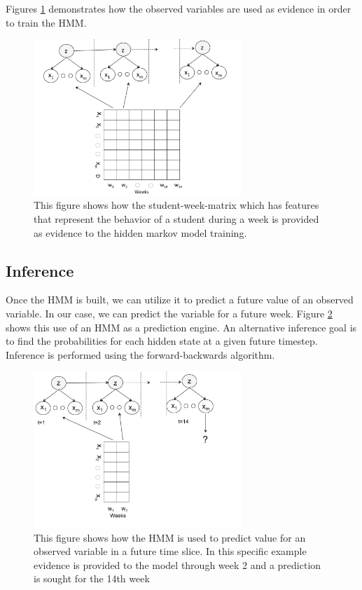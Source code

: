 Figures \ref{fig:hmm_training} demonstrates how the observed variables are used as evidence in order to train the HMM.


\begin{figure}[ht!]
  \caption{This figure shows how the student-week-matrix which has features that represent the behavior of a student during a week is provided as evidence to the hidden markov model training.}\label{fig:hmm_training}
  \centering
    \includegraphics[width=0.7\textwidth]{figures/week_matrix_to_hmm}
\end{figure}

\subsection{Inference}
Once the HMM is built, we can utilize it to predict a future value of an observed variable. In our case, we can predict the \sti variable for a future week. Figure \ref{fig:hmm_predict} shows this use of an HMM as a prediction engine. An alternative inference goal is to find the probabilities for each hidden state at a given future timestep. Inference is performed using the forward-backwards algorithm.

\begin{figure}[ht!]
  \caption{This figure shows how the HMM is used to predict value for an observed variable in a future time slice. In this specific example evidence is provided to the model through week 2 and a prediction is sought for the 14th week }\label{fig:hmm_predict}
  \centering
    \includegraphics[width=0.7\textwidth]{figures/hmm-as-predict}
\end{figure}

